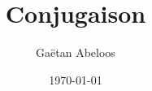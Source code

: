 \documentclass[french]{article}
\begin{document}
	
	\title{Conjugaison}
	\author{Gaëtan Abeloos}
	\date{\today}
	
	\maketitle
	
\end{document}
